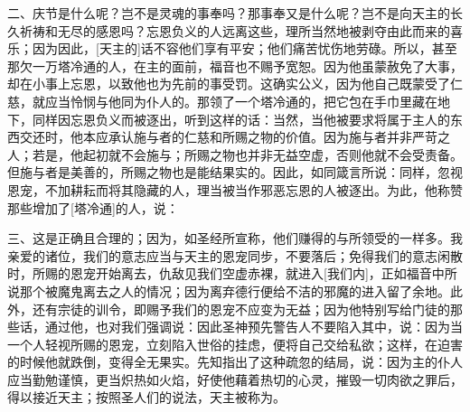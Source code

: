 二、庆节是什么呢？岂不是灵魂的事奉吗？那事奉又是什么呢？岂不是向天主的长久祈祷和无尽的感恩吗？忘恩负义的人远离这些，理所当然地被剥夺由此而来的喜乐；因为因此，[天主的]话不容他们享有平安；他们痛苦忧伤地劳碌。所以，甚至那欠一万塔冷通的人，在主的面前，福音也不赐予宽恕。因为他虽蒙赦免了大事，却在小事上忘恩，以致他也为先前的事受罚。这确实公义，因为他自己既蒙受了仁慈，就应当怜悯与他同为仆人的。那领了一个塔冷通的，把它包在手巾里藏在地下，同样因忘恩负义而被逐出，听到这样的话：当然，当他被要求将属于主人的东西交还时，他本应承认施与者的仁慈和所赐之物的价值。因为施与者并非严苛之人；若是，他起初就不会施与；所赐之物也并非无益空虚，否则他就不会受责备。但施与者是美善的，所赐之物也是能结果实的。因此，如同箴言所说：同样，忽视恩宠，不加耕耘而将其隐藏的人，理当被当作邪恶忘恩的人被逐出。为此，他称赞那些增加了[塔冷通]的人，说：\par

三、这是正确且合理的；因为，如圣经所宣称，他们赚得的与所领受的一样多。我亲爱的诸位，我们的意志应当与天主的恩宠同步，不要落后；免得我们的意志闲散时，所赐的恩宠开始离去，仇敌见我们空虚赤裸，就进入[我们内]，正如福音中所说那个被魔鬼离去之人的情况；因为离弃德行便给不洁的邪魔的进入留了余地。此外，还有宗徒的训令，即赐予我们的恩宠不应变为无益；因为他特别写给门徒的那些话，通过他，也对我们强调说：因此圣神预先警告人不要陷入其中，说：因为当一个人轻视所赐的恩宠，立刻陷入世俗的挂虑，便将自己交给私欲；这样，在迫害的时候他就跌倒，变得全无果实。先知指出了这种疏忽的结局，说：因为主的仆人应当勤勉谨慎，更当炽热如火焰，好使他藉着热切的心灵，摧毁一切肉欲之罪后，得以接近天主；按照圣人们的说法，天主被称为。\par

